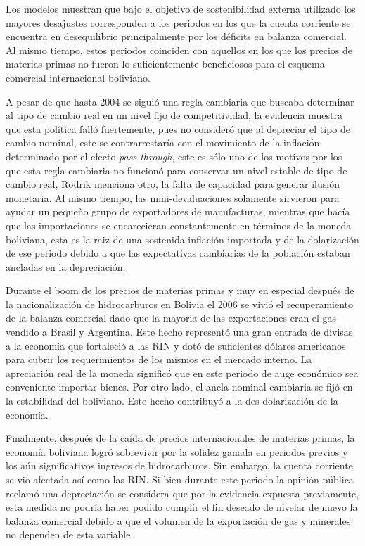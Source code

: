 \documentclass[12pt,letterpaper]{article}
\begin{document}
Los modelos muestran que bajo el objetivo de sostenibilidad externa utilizado los mayores desajustes corresponden a los periodos en los que la cuenta corriente se encuentra en desequilibrio principalmente por los déficits en balanza comercial. Al mismo tiempo, estos periodos coinciden con aquellos en los que los precios de materias primas no fueron lo suficientemente beneficiosos para el esquema comercial internacional boliviano.

A pesar de que hasta 2004 se siguió una regla cambiaria que buscaba determinar al tipo de cambio real en un nivel fijo de competitividad, la evidencia muestra que esta política falló fuertemente, pues no consideró que al depreciar el tipo de cambio nominal, este se contrarrestaría con el movimiento de la inflación determinado por el efecto \emph{pass-through}, este es sólo uno de los motivos por los que esta regla cambiaria no funcionó para conservar un nivel estable de tipo de cambio real, Rodrik menciona otro, la falta de capacidad para generar ilusión monetaria. Al mismo tiempo, las mini-devaluaciones solamente sirvieron para ayudar un pequeño grupo de exportadores de manufacturas, mientras que hacía que las importaciones se encarecieran constantemente en términos de la moneda boliviana, esta es la raiz de una sostenida inflación importada y de la dolarización de ese periodo debido a que las expectativas cambiarias de la población estaban ancladas en la depreciación.

Durante el boom de los precios de materias primas y muy en especial después de la nacionalización de hidrocarburos en Bolivia el 2006 se vivió el recuperamiento de la balanza comercial dado que la mayoria de las exportaciones eran el gas vendido a Brasil y Argentina. Este hecho representó una gran entrada de divisas a la economía que fortaleció a las RIN y dotó de suficientes dólares americanos para cubrir los requerimientos de los mismos en el mercado interno. La apreciación real de la moneda significó que en este periodo de auge económico sea conveniente importar bienes. Por otro lado, el ancla nominal cambiaria se fijó en la estabilidad del boliviano. Este hecho contribuyó a la des-dolarización de la economía.

Finalmente, después de la caída de precios internacionales de materias primas, la economía boliviana logró sobrevivir por la solidez ganada en periodos previos y los aún significativos ingresos de hidrocarburos. Sin embargo, la cuenta corriente se vio afectada así como las RIN. Si bien durante este periodo la opinión pública reclamó una depreciación se considera que por la evidencia expuesta previamente, esta medida no podría haber podido cumplir el fin deseado de nivelar de nuevo la balanza comercial debido a que el volumen de la exportación de gas y minerales no dependen de esta variable.
\end{document}
